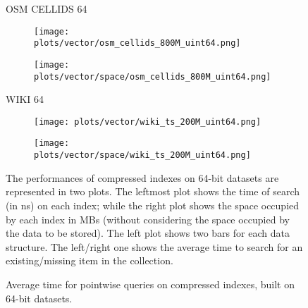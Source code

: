 \documentclass{article}
\begin{document}
\begin{figure}[!htbp]
{\begin{minipage}[t][0.98\textheight][t]{\textwidth}
    \begin{minipage}{0.03\linewidth}
    \begin{sideways}\small OSM CELLIDS 64\end{sideways}
    \end{minipage}
    \begin{minipage}{0.32\linewidth}
        \begin{figure}[H]
        \texttt{[image: plots/vector/osm\_cellids\_800M\_uint64.png]}
        \end{figure}
    \end{minipage}
    \begin{minipage}{0.32\linewidth}
        \begin{figure}[H]
            \texttt{[image: plots/vector/space/osm\_cellids\_800M\_uint64.png]}
        \end{figure}
    \end{minipage}
    \vspace*{-15px}

    \begin{minipage}{0.03\linewidth}
    \begin{sideways}\small WIKI 64\end{sideways}
    \end{minipage}
    \begin{minipage}{0.32\linewidth}
        \begin{figure}[H]
        \texttt{[image: plots/vector/wiki\_ts\_200M\_uint64.png]}
        \end{figure}
    \end{minipage}
    \begin{minipage}{0.32\linewidth}
        \begin{figure}[H]
            \texttt{[image: plots/vector/space/wiki\_ts\_200M\_uint64.png]}
        \end{figure}
    \end{minipage}
    \vfill
    
    \centering
    \begin{minipage}{\linewidth}
        The performances of compressed indexes on 64-bit datasets are represented in two plots. The leftmost plot shows the time of search (in ns) on each index; while the right plot shows the space occupied by each index in MBs (without considering the space occupied by the data to be stored). The left plot shows two bars for each data structure. The left/right one shows the average time to search for an existing/missing item in the collection.\end{minipage}
    \vspace{10px}
\end{minipage}
}
\caption{Average time for pointwise queries on compressed indexes, built on 64-bit datasets.}
\end{figure}
\end{document}
